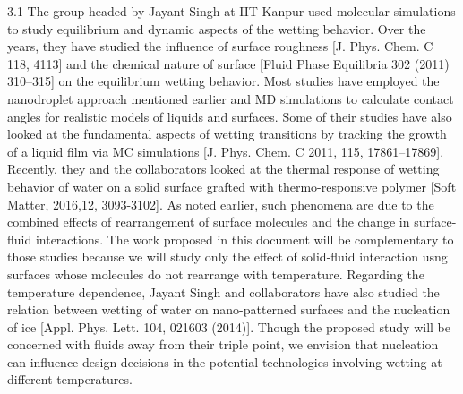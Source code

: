 \par 3.1 The group headed by Jayant Singh at IIT Kanpur used molecular simulations to study equilibrium and dynamic aspects of the wetting behavior. Over the years, they have studied the influence of surface roughness [J. Phys. Chem. C 118, 4113] and the chemical nature of surface [Fluid Phase Equilibria 302 (2011) 310–315] on the equilibrium wetting behavior. Most studies have employed the nanodroplet approach mentioned earlier and MD simulations to calculate contact angles for realistic models of liquids and surfaces. Some of their studies have also looked at the fundamental aspects of wetting transitions by tracking the growth of a liquid film via MC simulations [J. Phys. Chem. C 2011, 115, 17861–17869]. Recently, they and the collaborators looked at the thermal response of wetting behavior of water on a solid surface grafted with thermo-responsive polymer [Soft Matter, 2016,12, 3093-3102]. As noted earlier, such phenomena are due to the combined effects of rearrangement of surface molecules and the change in surface-fluid interactions. The work proposed in this document will be complementary to those studies because we will study only the effect of solid-fluid interaction usng surfaces whose molecules do not rearrange with temperature. Regarding the temperature dependence, Jayant Singh and collaborators have also studied the relation between wetting of water on nano-patterned surfaces and the nucleation of ice [Appl. Phys. Lett. 104, 021603 (2014)]. Though the proposed study will be concerned with fluids away from their triple point, we envision that nucleation can influence design decisions in the potential technologies involving wetting at different temperatures.
